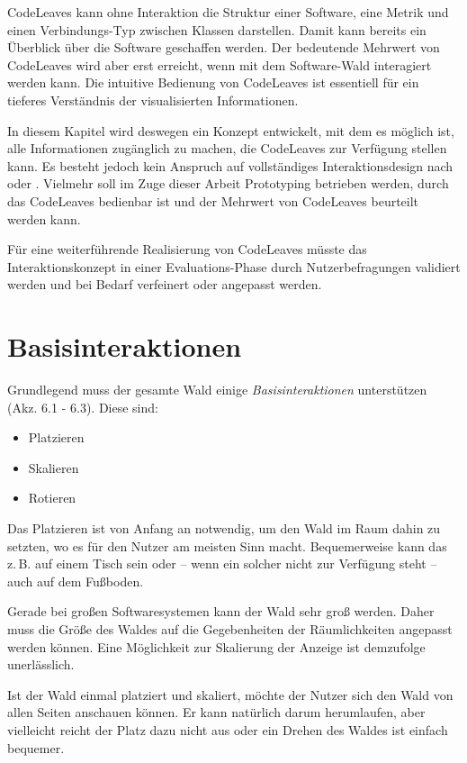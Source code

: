 CodeLeaves kann ohne Interaktion die Struktur einer Software, eine Metrik und einen Verbindungs-Typ zwischen Klassen darstellen. Damit kann bereits ein Überblick über die Software geschaffen werden. Der bedeutende Mehrwert von CodeLeaves wird aber erst erreicht, wenn mit dem Software-Wald interagiert werden kann. Die intuitive Bedienung von CodeLeaves ist essentiell für ein tieferes Verständnis der visualisierten Informationen.

In diesem Kapitel wird deswegen ein Konzept entwickelt, mit dem es möglich ist, alle Informationen zugänglich zu machen, die CodeLeaves zur Verfügung stellen kann. Es besteht jedoch kein Anspruch auf vollständiges Interaktionsdesign nach \cite{goodwin2011designing} oder \cite{cooper2014face}. Vielmehr soll im Zuge dieser Arbeit Prototyping betrieben werden, durch das CodeLeaves bedienbar ist und der Mehrwert von CodeLeaves beurteilt werden kann.

Für eine weiterführende Realisierung von CodeLeaves müsste das Interaktionskonzept in einer Evaluations-Phase durch Nutzerbefragungen validiert werden und bei Bedarf verfeinert oder angepasst werden.

\section{Basisinteraktionen}
Grundlegend muss der gesamte Wald einige \textit{Basisinteraktionen} unterstützen (Akz. 6.1 - 6.3). Diese sind:

\begin{itemize}
  \item Platzieren
  \item Skalieren
  \item Rotieren
\end{itemize}

Das Platzieren ist von Anfang an notwendig, um den Wald im Raum dahin zu setzten, wo es für den Nutzer am meisten Sinn macht. Bequemerweise kann das z.\,B. auf einem Tisch sein oder -- wenn ein solcher nicht zur Verfügung steht -- auch auf dem Fußboden.

Gerade bei großen Softwaresystemen kann der Wald sehr groß werden. Daher muss die Größe des Waldes auf die Gegebenheiten der Räumlichkeiten angepasst werden können. Eine Möglichkeit zur Skalierung der Anzeige ist demzufolge unerlässlich.

Ist der Wald einmal platziert und skaliert, möchte der Nutzer sich den Wald von allen Seiten anschauen können. Er kann natürlich darum herumlaufen, aber vielleicht reicht der Platz dazu nicht aus oder ein Drehen des Waldes ist einfach bequemer.

